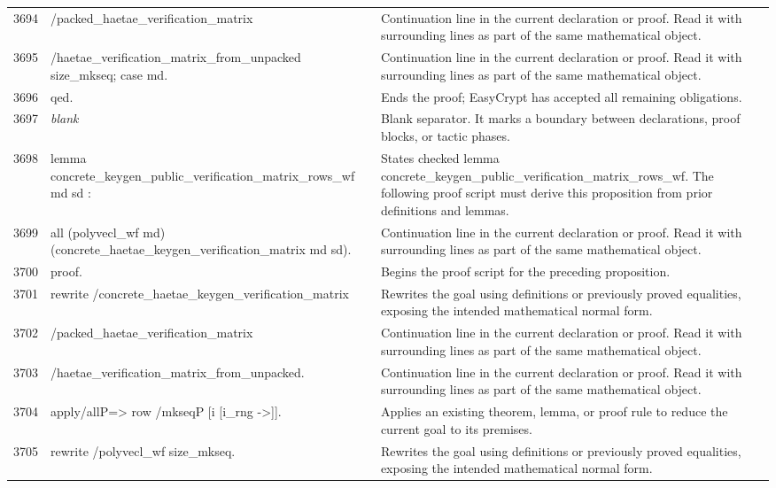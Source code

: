 \documentclass[10pt]{article}
\begin{document}
\begin{longtable}{r L{0.53\textwidth} L{0.37\textwidth}}
3694 & {\ttfamily\scriptsize            /packed\_haetae\_verification\_matrix} & Continuation line in the current declaration or proof.  Read it with surrounding lines as part of the same mathematical object. \\
3695 & {\ttfamily\scriptsize            /haetae\_verification\_matrix\_from\_unpacked size\_mkseq; case md.} & Continuation line in the current declaration or proof.  Read it with surrounding lines as part of the same mathematical object. \\
3696 & {\ttfamily\scriptsize qed.} & Ends the proof; EasyCrypt has accepted all remaining obligations. \\
3697 & {\ttfamily\scriptsize \emph{blank}} & Blank separator.  It marks a boundary between declarations, proof blocks, or tactic phases. \\
3698 & {\ttfamily\scriptsize lemma concrete\_keygen\_public\_verification\_matrix\_rows\_wf md sd :} & States checked lemma concrete\_keygen\_public\_verification\_matrix\_rows\_wf.  The following proof script must derive this proposition from prior definitions and lemmas. \\
3699 & {\ttfamily\scriptsize   all (polyvecl\_wf md) (concrete\_haetae\_keygen\_verification\_matrix md sd).} & Continuation line in the current declaration or proof.  Read it with surrounding lines as part of the same mathematical object. \\
3700 & {\ttfamily\scriptsize proof.} & Begins the proof script for the preceding proposition. \\
3701 & {\ttfamily\scriptsize rewrite /concrete\_haetae\_keygen\_verification\_matrix} & Rewrites the goal using definitions or previously proved equalities, exposing the intended mathematical normal form. \\
3702 & {\ttfamily\scriptsize         /packed\_haetae\_verification\_matrix} & Continuation line in the current declaration or proof.  Read it with surrounding lines as part of the same mathematical object. \\
3703 & {\ttfamily\scriptsize         /haetae\_verification\_matrix\_from\_unpacked.} & Continuation line in the current declaration or proof.  Read it with surrounding lines as part of the same mathematical object. \\
3704 & {\ttfamily\scriptsize apply/allP=> row /mkseqP [i [i\_rng ->]].} & Applies an existing theorem, lemma, or proof rule to reduce the current goal to its premises. \\
3705 & {\ttfamily\scriptsize rewrite /polyvecl\_wf size\_mkseq.} & Rewrites the goal using definitions or previously proved equalities, exposing the intended mathematical normal form. \\

\end{longtable}
\end{document}
